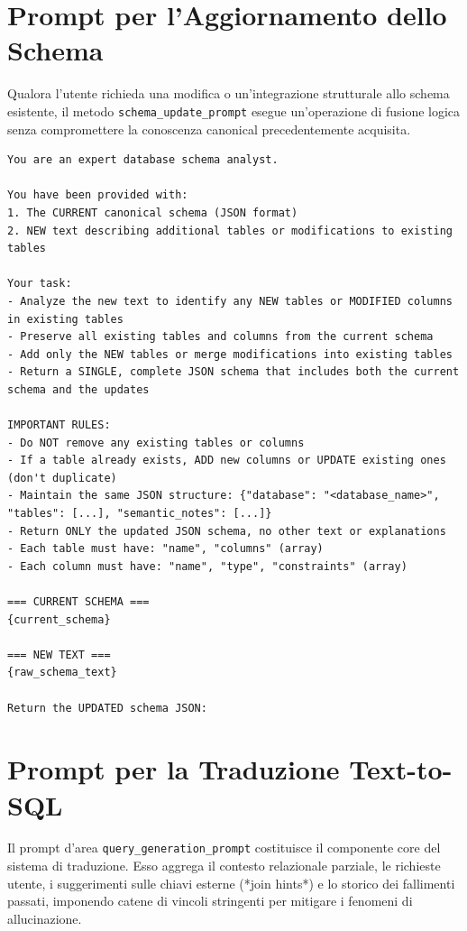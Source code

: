 \section{Prompt per l'Aggiornamento dello Schema}
Qualora l'utente richieda una modifica o un'integrazione strutturale allo schema esistente, il metodo \texttt{schema\_update\_prompt} esegue un'operazione di fusione logica senza compromettere la conoscenza canonical precedentemente acquisita.

\begin{lstlisting}[basicstyle=\ttfamily\footnotesize, frame=single, breaklines=true, caption={Struttura del prompt \texttt{schema\_update\_prompt}}, label={lst:prompt_schema_update}]
You are an expert database schema analyst.

You have been provided with:
1. The CURRENT canonical schema (JSON format)
2. NEW text describing additional tables or modifications to existing tables

Your task:
- Analyze the new text to identify any NEW tables or MODIFIED columns in existing tables
- Preserve all existing tables and columns from the current schema
- Add only the NEW tables or merge modifications into existing tables
- Return a SINGLE, complete JSON schema that includes both the current schema and the updates

IMPORTANT RULES:
- Do NOT remove any existing tables or columns
- If a table already exists, ADD new columns or UPDATE existing ones (don't duplicate)
- Maintain the same JSON structure: {"database": "<database_name>", "tables": [...], "semantic_notes": [...]}
- Return ONLY the updated JSON schema, no other text or explanations
- Each table must have: "name", "columns" (array)
- Each column must have: "name", "type", "constraints" (array)

=== CURRENT SCHEMA ===
{current_schema}

=== NEW TEXT ===
{raw_schema_text}

Return the UPDATED schema JSON:
\end{lstlisting}

\section{Prompt per la Traduzione Text-to-SQL}
Il prompt d'area \texttt{query\_generation\_prompt} costituisce il componente core del sistema di traduzione. Esso aggrega il contesto relazionale parziale, le richieste utente, i suggerimenti sulle chiavi esterne (*join hints*) e lo storico dei fallimenti passati, imponendo catene di vincoli stringenti per mitigare i fenomeni di allucinazione.

